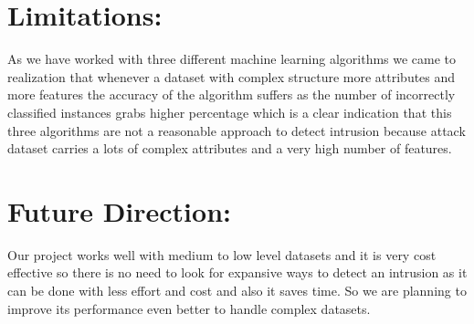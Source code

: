 \documentclass[conference]{IEEEtran}
\begin{document}
\section{Limitations:  }
As we have worked with three different machine learning algorithms we came to realization that whenever a dataset with complex structure more attributes and more features the accuracy of the algorithm suffers as the number of incorrectly classified instances grabs higher percentage which is a clear indication that this three algorithms are not a reasonable approach to detect intrusion because attack dataset carries a lots of complex attributes and a very high number of features.

\section{Future Direction:  }
Our project works well with medium to low level datasets and it is very cost effective so there is no need to look for expansive ways to detect an intrusion as it can be done with less effort and cost and also it saves time. So we are planning to improve its performance even better to handle complex datasets. \\




\end{document}
